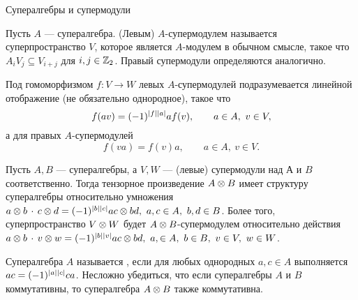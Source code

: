 \begin{subsection}{Супералгебры и супермодули}
  \begin{definition}
    Пусть $ A $ --- супералгебра. (Левым) $A$-супермодулем называется
    суперпространство $ V $, которое является $ A $-модулем в обычном смысле,
    такое что $ A_i V_j \subseteq V_{i+j} $ для $ i, j \in \mathbb{Z}_2 $.
    Правый супермодули определяются аналогично.
  \end{definition}
  Под гомоморфизмом $ f: V \to W $ левых $A$-супермодулей подразумевается
  линейной отображение (не обязательно однородное), такое что
  $$ f(av) = \sgn{f}{a} a f(v), \qquad a \in A, ~v \in V, $$
  а для правых $A$-супермодулей
  $$ f(va) = f(v) a, \qquad a \in A, ~v \in V. $$

  Пусть $ A, B $ --- супералгебры, а $ V, W $ --- (левые) супермодули над
  $ А $ и $ B $ соответственно. Тогда тензорное произведение $ A \otimes B $ имеет
  структуру супералгебры относительно умножения
  $ a \o b \,\cdot \,c \o d = \sgn{b}{c} ac \o bd, ~a,c \in A, ~b,d \in B $.
  Более того, суперпространство $ V \otimes W $ будет
  $ A \otimes B $-супермодулем относительно действия
  $ a \o b \,\cdot \,v \o w = \sgn{b}{v} ac \o bd, ~a, \in A, ~b \in B, ~v \in V, ~w \in W $.

  Супералгебра $ A $ называется , если для любых однородных
  $ a, c \in A $ выполняется $ ac = \sgn{a}{c} ca $. Несложно убедиться, что
  если супералгебры $ A $ и $ B $ коммутативны, то супералгебра $ A \otimes B $ также
  коммутативна.
\end{subsection}

